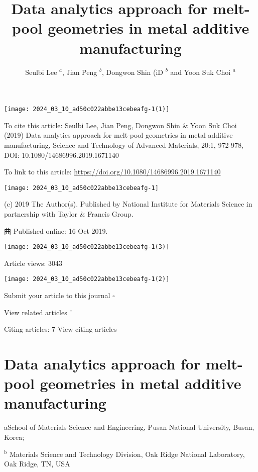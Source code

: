 \documentclass[10pt]{article}
\title{Data analytics approach for melt-pool geometries in metal additive manufacturing }
\author{Seulbi Lee ${ }^{a}$, Jian Peng ${ }^{b}$, Dongwon Shin (iD ${ }^{b}$ and Yoon Suk Choi ${ }^{a}$}
\date{}
\begin{document}
\maketitle
\begin{center}
\texttt{[image: 2024\_03\_10\_ad50c022abbe13cebeafg-1(1)]}
\end{center}

To cite this article: Seulbi Lee, Jian Peng, Dongwon Shin \& Yoon Suk Choi (2019) Data analytics approach for melt-pool geometries in metal additive manufacturing, Science and Technology of Advanced Materials, 20:1, 972-978, DOI: 10.1080/14686996.2019.1671140

To link to this article: \href{https://doi.org/10.1080/14686996.2019.1671140}{https://doi.org/10.1080/14686996.2019.1671140}

\begin{center}
\texttt{[image: 2024\_03\_10\_ad50c022abbe13cebeafg-1]}
\end{center}

(c) 2019 The Author(s). Published by National Institute for Materials Science in partnership with Taylor \& Francis Group.

曲 Published online: 16 Oct 2019.

\begin{center}
\texttt{[image: 2024\_03\_10\_ad50c022abbe13cebeafg-1(3)]}
\end{center}

Article views: 3043

\begin{center}
\texttt{[image: 2024\_03\_10\_ad50c022abbe13cebeafg-1(2)]}
\end{center}

Submit your article to this journal $\square$

View related articles $־$

Citing articles: 7 View citing articles

\section*{Data analytics approach for melt-pool geometries in metal additive manufacturing }
aSchool of Materials Science and Engineering, Pusan National University, Busan, Korea;

${ }^{\mathrm{b}}$ Materials Science and Technology Division, Oak Ridge National Laboratory, Oak Ridge, TN, USA
\end{document}
